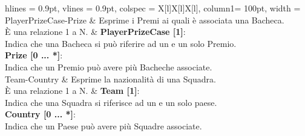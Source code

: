 \begin{tblr}{
    hlines = {0.9pt}, vlines = {0.9pt}, colspec = {X[l]X[l]X[l]}, column{1}= {100pt},
    width = \textwidth
}
	{
		PlayerPrizeCase-Prize
	}
	&
	{
		Esprime i Premi ai quali è associata una Bacheca.\\
		È una relazione 1 a N.
	}
	&
	{
		\textbf{PlayerPrizeCase [1]}:\\Indica che una Bacheca
			si può riferire ad un e un solo Premio.\\
		\medskip\textbf{Prize [0 ... *]}:\\Indica che un Premio
			può avere più Bacheche associate.
	}
	\\
	{
		Team-Country
	}
	&
	{
		Esprime la nazionalità di una Squadra.\\
		È una relazione 1 a N.
	}
	&
	{
		\textbf{Team [1]}:\\Indica che una Squadra si riferisce
			ad un e un solo paese.\\
		\medskip\textbf{Country [0 ... *]}:\\Indica che un Paese
			può avere più Squadre associate.
	}
	\\
\end{tblr}

\newpage

